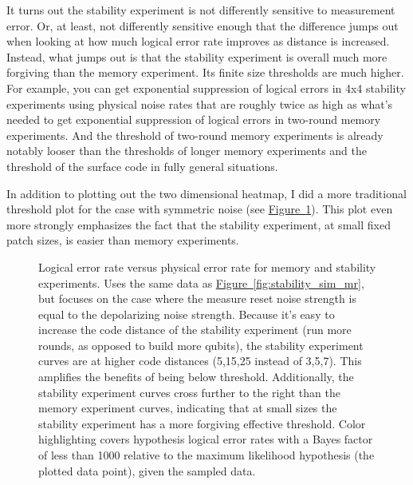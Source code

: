 \documentclass[onecolumn,unpublished,a4paper]{quantumarticle}
\theoremstyle{definition}
\theoremstyle{definition}
\theoremstyle{definition}
\newcommand{\fig}[1]{\hyperref[fig:#1]{Figure~\ref*{fig:#1}}}
\begin{document}
It turns out the stability experiment is not differently sensitive to measurement error.
Or, at least, not differently sensitive enough that the difference jumps out when looking at how much logical error rate improves as distance is increased.
Instead, what jumps out is that the stability experiment is overall much more forgiving than the memory experiment.
Its finite size thresholds are much higher.
For example, you can get exponential suppression of logical errors in 4x4 stability experiments using physical noise rates that are roughly twice as high as what's needed to get exponential suppression of logical errors in two-round memory experiments.
And the threshold of two-round memory experiments is already notably looser than the thresholds of longer memory experiments and the threshold of the surface code in fully general situations.

In addition to plotting out the two dimensional heatmap, I did a more traditional threshold plot for the case with symmetric noise (see \fig{stability_sim_threshold}).
This plot even more strongly emphasizes the fact that the stability experiment, at small fixed patch sizes, is easier than memory experiments.

\begin{figure}
    \centering
    \caption{
        Logical error rate versus physical error rate for memory and stability experiments.
        Uses the same data as \fig{stability_sim_mr}, but focuses on the case where the measure reset noise strength is equal to the depolarizing noise strength.
        Because it's easy to increase the code distance of the stability experiment (run more rounds, as opposed to build more qubits), the stability experiment curves are at higher code distances (5,15,25 instead of 3,5,7).
        This amplifies the benefits of being below threshold.
        Additionally, the stability experiment curves cross further to the right than the memory experiment curves, indicating that at small sizes the stability experiment has a more forgiving effective threshold.
        Color highlighting covers hypothesis logical error rates with a Bayes factor of less than 1000 relative to the maximum likelihood hypothesis (the plotted data point), given the sampled data.
    }
    \label{fig:stability_sim_threshold}
\end{figure}
\end{document}
